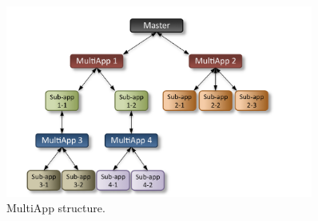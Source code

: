 \begin{figure}[!h]
\centering
\includegraphics[clip=true,width=0.9\textwidth]{Figures/moose1}
\caption{MultiApp structure.}
\label{f:moose1}
\end{figure}



